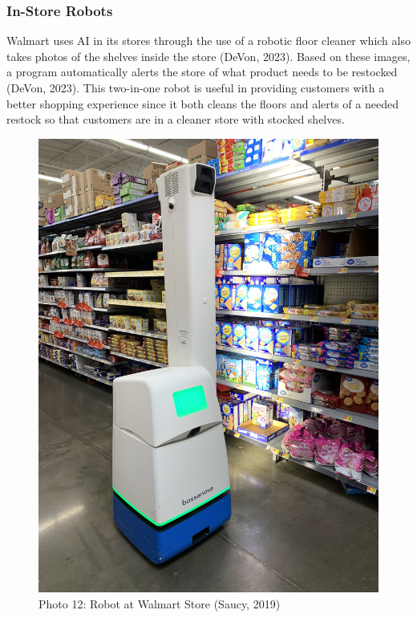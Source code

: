 \documentclass[
]{article}
\begin{document}
\hypertarget{in-store-robots}{%
\subsubsection{In-Store Robots}\label{in-store-robots}}

Walmart uses AI in its stores through the use of a robotic floor cleaner which also takes photos of the shelves inside the store (DeVon, 2023). Based on these images, a program automatically alerts the store of what product needs to be restocked (DeVon, 2023). This two-in-one robot is useful in providing customers with a better shopping experience since it both cleans the floors and alerts of a needed restock so that customers are in a cleaner store with stocked shelves.

\begin{figure}
\centering
\includegraphics{Bossa_Nova_robot_scanning_shelf_at_Walmart.jpg}
\caption{Photo 12: Robot at Walmart Store (Saucy, 2019)}
\end{figure}
\end{document}
